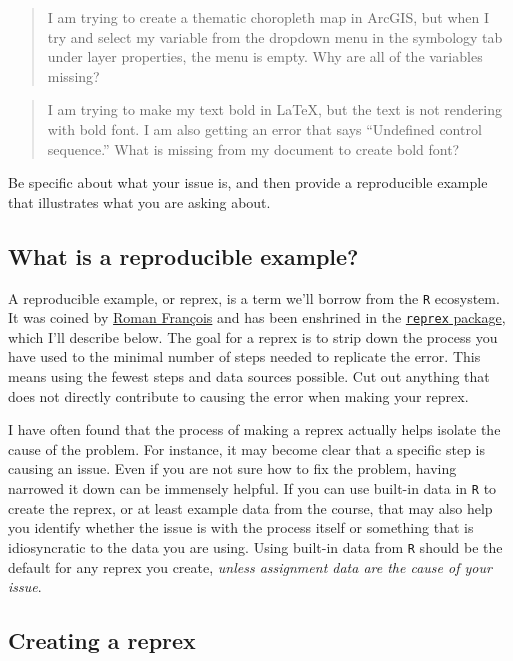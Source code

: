 \documentclass[]{book}
\theoremstyle{definition}
\theoremstyle{definition}
\theoremstyle{definition}
\theoremstyle{remark}
\begin{document}
\begin{quote}
I am trying to create a thematic choropleth map in ArcGIS, but when I
try and select my variable from the dropdown menu in the symbology tab
under layer properties, the menu is empty. Why are all of the variables
missing?
\end{quote}

\begin{quote}
I am trying to make my text bold in LaTeX, but the text is not rendering
with bold font. I am also getting an error that says ``Undefined control
sequence.'' What is missing from my document to create bold font?
\end{quote}

Be specific about what your issue is, and then provide a reproducible
example that illustrates what you are asking about.

\subsection{What is a reproducible
example?}\label{what-is-a-reproducible-example}

A reproducible example, or reprex, is a term we'll borrow from the
\texttt{R} ecosystem. It was coined by
\href{https://twitter.com/romain_francois/status/530011023743655936}{Roman
François} and has been enshrined in the
\href{http://reprex.tidyverse.org}{\texttt{reprex} package}, which I'll
describe below. The goal for a reprex is to strip down the process you
have used to the minimal number of steps needed to replicate the error.
This means using the fewest steps and data sources possible. Cut out
anything that does not directly contribute to causing the error when
making your reprex.

I have often found that the process of making a reprex actually helps
isolate the cause of the problem. For instance, it may become clear that
a specific step is causing an issue. Even if you are not sure how to fix
the problem, having narrowed it down can be immensely helpful. If you
can use built-in data in \texttt{R} to create the reprex, or at least
example data from the course, that may also help you identify whether
the issue is with the process itself or something that is idiosyncratic
to the data you are using. Using built-in data from \texttt{R} should be
the default for any reprex you create, \emph{unless assignment data are
the cause of your issue}.

\subsection{Creating a reprex}\label{creating-a-reprex}
\end{document}
